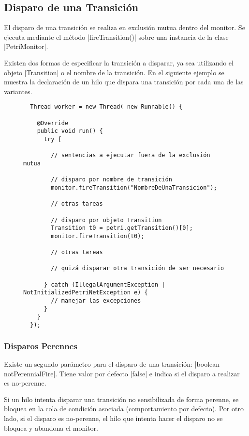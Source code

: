 \subsection{Disparo de una Transición}

El disparo de una transición se realiza en exclusión mutua dentro del monitor.
Se ejecuta mediante el método |fireTransition()| sobre una instancia
de la clase |PetriMonitor|.

Existen dos formas de especificar la transición a disparar, ya sea utilizando
el objeto |Transition| o el nombre de la transición.
En el siguiente ejemplo se muestra la declaración de un hilo que dispara una
transición por cada una de las variantes.

\begin{figure}[H]
\centering
\begin{verbatim}
  Thread worker = new Thread( new Runnable() {
  
    @Override
    public void run() {
      try {
      
        // sentencias a ejecutar fuera de la exclusión mutua

        // disparo por nombre de transición
        monitor.fireTransition("NombreDeUnaTransicion");

        // otras tareas

        // disparo por objeto Transition
        Transition t0 = petri.getTransition()[0];
        monitor.fireTransition(t0);
      
        // otras tareas
      
        // quizá disparar otra transición de ser necesario

      } catch (IllegalArgumentException | NotInitializedPetriNetException e) {
        // manejar las excepciones
      }
    }
  });
\end{verbatim}
\end{figure}

\subsubsection*{Disparos Perennes}
\label{disparos_perennes}
Existe un segundo parámetro para el disparo de una transición: 
|boolean notPerennialFire|. Tiene valor por defecto
|false| e indica si el disparo a realizar es no-perenne.

Si un hilo intenta disparar una transición no sensibilizada de forma perenne, se
bloquea en la cola de condición asociada (comportamiento por defecto). Por otro
lado, si el disparo es no-perenne, el hilo que intenta hacer el disparo no se
bloquea y abandona el monitor.

